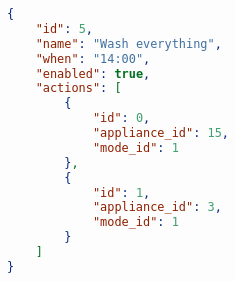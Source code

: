 \begin{lstlisting}[language=json,caption={Example of a routine with two actions.},label=code:routine_wash_everything,float,floatplacement=H]
{
    "id": 5,
    "name": "Wash everything",
    "when": "14:00",
    "enabled": true,
    "actions": [
        {
            "id": 0,
            "appliance_id": 15,
            "mode_id": 1
        },
        {
            "id": 1,
            "appliance_id": 3,
            "mode_id": 1
        }
    ]
}
\end{lstlisting}